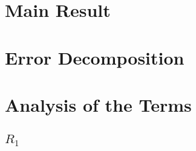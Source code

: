\section{Main Result}
  
\section{Error Decomposition}
  
\section{Analysis of the Terms}
  \subsection{$R_1$}
    
